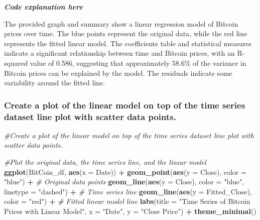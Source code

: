 \documentclass[
]{book}
\newenvironment{Shaded}{\begin{snugshade}}{\end{snugshade}}
\newcommand{\AttributeTok}[1]{\textcolor[rgb]{0.13,0.29,0.53}{#1}}
\newcommand{\CommentTok}[1]{\textcolor[rgb]{0.56,0.35,0.01}{\textit{#1}}}
\newcommand{\FunctionTok}[1]{\textcolor[rgb]{0.13,0.29,0.53}{\textbf{#1}}}
\newcommand{\NormalTok}[1]{#1}
\newcommand{\SpecialCharTok}[1]{\textcolor[rgb]{0.81,0.36,0.00}{\textbf{#1}}}
\newcommand{\StringTok}[1]{\textcolor[rgb]{0.31,0.60,0.02}{#1}}
\begin{document}
\emph{\textbf{Code explanation here}}

The provided graph and summary show a linear regression model of Bitcoin prices over time. The blue points represent the original data, while the red line represents the fitted linear model. The coefficients table and statistical measures indicate a significant relationship between time and Bitcoin prices, with an R-squared value of 0.586, suggesting that approximately 58.6\% of the variance in Bitcoin prices can be explained by the model. The residuals indicate some variability around the fitted line.

\subsubsection{Create a plot of the linear model on top of the time series dataset line plot with scatter data points.}\label{create-a-plot-of-the-linear-model-on-top-of-the-time-series-dataset-line-plot-with-scatter-data-points.}

\begin{Shaded}
\begin{Highlighting}[]
\CommentTok{\#Create a plot of the linear model on top of the time series dataset line plot with scatter data points.}
  
\CommentTok{\#Plot the original data, the time series line, and the linear model}
\FunctionTok{ggplot}\NormalTok{(BitCoin\_df, }\FunctionTok{aes}\NormalTok{(}\AttributeTok{x =}\NormalTok{ Date)) }\SpecialCharTok{+}
\FunctionTok{geom\_point}\NormalTok{(}\FunctionTok{aes}\NormalTok{(}\AttributeTok{y =}\NormalTok{ Close), }\AttributeTok{color =} \StringTok{"blue"}\NormalTok{) }\SpecialCharTok{+}  \CommentTok{\# Original data points}
\FunctionTok{geom\_line}\NormalTok{(}\FunctionTok{aes}\NormalTok{(}\AttributeTok{y =}\NormalTok{ Close), }\AttributeTok{color =} \StringTok{"blue"}\NormalTok{, }\AttributeTok{linetype =} \StringTok{"dashed"}\NormalTok{) }\SpecialCharTok{+}  \CommentTok{\# Time series line}
\FunctionTok{geom\_line}\NormalTok{(}\FunctionTok{aes}\NormalTok{(}\AttributeTok{y =}\NormalTok{ Fitted\_Close), }\AttributeTok{color =} \StringTok{"red"}\NormalTok{) }\SpecialCharTok{+}  \CommentTok{\# Fitted linear model line}
\FunctionTok{labs}\NormalTok{(}\AttributeTok{title =} \StringTok{"Time Series of Bitcoin Prices with Linear Model"}\NormalTok{,}
     \AttributeTok{x =} \StringTok{"Date"}\NormalTok{,}
     \AttributeTok{y =} \StringTok{"Close Price"}\NormalTok{) }\SpecialCharTok{+}
\FunctionTok{theme\_minimal}\NormalTok{() }
\end{Highlighting}
\end{Shaded}
\end{document}
